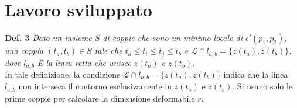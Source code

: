 \chapter{Lavoro sviluppato} 
\label{Cap3}

\textbf{Def. 3} \textit{Dato un insieme $S$ di coppie che sono un minimo locale di $\epsilon'(p_1,p_2)$, una coppia $(t_a,t_b) \in S$ tale che  $t_a \leq t_i \leq t_j \leq t_b$ e $\mathcal{L} \cap l_{a,b} = \lbrace z(t_a),z(t_b)\rbrace$, dove $l_{a,b}$ Ë la linea retta che unisce $z(t_a)$ e $z(t_b)$.}\\
In tale definizione, la condizione $\mathcal{L} \cap l_{a,b} = \lbrace z(t_a),z(t_b)\rbrace$ indica che la linea $l_{a,b}$ non interseca il contorno esclusivamente in $z(t_a)$ e $z(t_b)$. Si usano solo le prime coppie per calcolare la dimensione deformabile $r$.   

